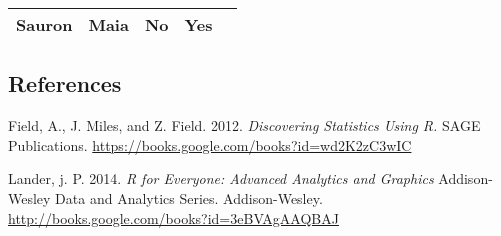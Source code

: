 \documentclass[
]{article}
\begin{document}
\begin{longtable}[]{@{}ccccc@{}}
\begin{minipage}[t]{0.11\columnwidth}\centering
Sauron\strut
\end{minipage} & \begin{minipage}[t]{0.11\columnwidth}\centering
Maia\strut
\end{minipage} & \begin{minipage}[t]{0.20\columnwidth}\centering
No\strut
\end{minipage} & \begin{minipage}[t]{0.21\columnwidth}\centering
Yes\strut
\end{minipage} & \begin{minipage}[t]{0.08\columnwidth}\centering
7052\strut
\end{minipage}\tabularnewline
\bottomrule
\end{longtable}

\hypertarget{references}{%
\subsection{References}\label{references}}

Field, A., J. Miles, and Z. Field. 2012. \emph{Discovering Statistics
Using R.} SAGE Publications.
\url{https://books.google.com/books?id=wd2K2zC3wIC}

Lander, j. P. 2014. \emph{R for Everyone: Advanced Analytics and
Graphics} Addison-Wesley Data and Analytics Series. Addison-Wesley.
\url{http://books.google.com/books?id=3eBVAgAAQBAJ}
\end{document}
